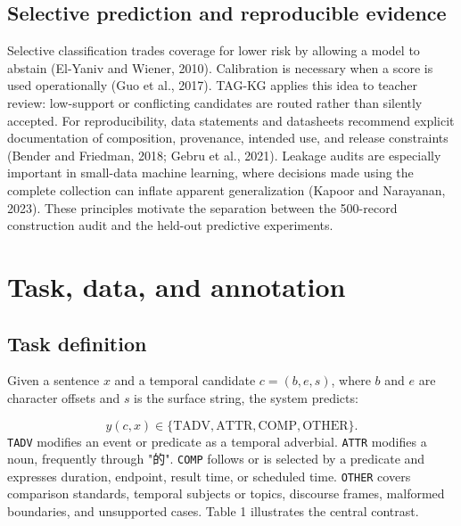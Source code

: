 \documentclass{CUP-JNL-NLP}
\begin{document}
\subsection{Selective prediction and reproducible evidence}
Selective classification trades coverage for lower risk by allowing a model to abstain (El-Yaniv and Wiener, 2010). Calibration is necessary when a score is used operationally (Guo et al., 2017). TAG-KG applies this idea to teacher review: low-support or conflicting candidates are routed rather than silently accepted. For reproducibility, data statements and datasheets recommend explicit documentation of composition, provenance, intended use, and release constraints (Bender and Friedman, 2018; Gebru et al., 2021). Leakage audits are especially important in small-data machine learning, where decisions made using the complete collection can inflate apparent generalization (Kapoor and Narayanan, 2023). These principles motivate the separation between the 500-record construction audit and the held-out predictive experiments.

\section{Task, data, and annotation}
\subsection{Task definition}
Given a sentence $x$ and a temporal candidate $c=(b,e,s)$, where $b$ and $e$ are character offsets and $s$ is the surface string, the system predicts:

\begin{equation}
y(c,x)\in\{\mathrm{TADV},\mathrm{ATTR},\mathrm{COMP},\mathrm{OTHER}\}.
\end{equation}
\texttt{TADV} modifies an event or predicate as a temporal adverbial. \texttt{ATTR} modifies a noun, frequently through "的". \texttt{COMP} follows or is selected by a predicate and expresses duration, endpoint, result time, or scheduled time. \texttt{OTHER} covers comparison standards, temporal subjects or topics, discourse frames, malformed boundaries, and unsupported cases. Table 1 illustrates the central contrast.
\end{document}
